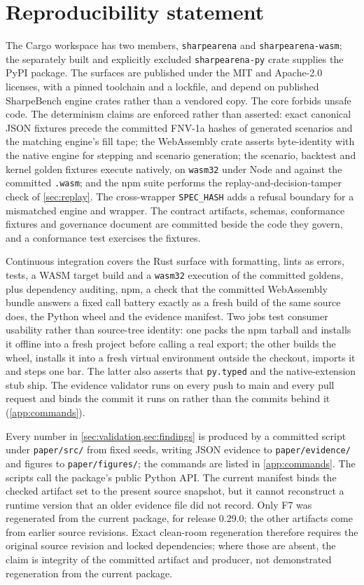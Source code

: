 \section{Reproducibility statement}\label{sec:repro}

The Cargo workspace has two members, \texttt{sharpearena} and \texttt{sharpearena-wasm}; the separately built and explicitly excluded \texttt{sharpearena-py} crate supplies the PyPI package. The surfaces are published under the MIT and Apache-2.0 licenses, with a pinned toolchain and a lockfile, and depend on published SharpeBench engine crates rather than a vendored copy. The core forbids unsafe code. The determinism claims are enforced rather than asserted: exact canonical JSON fixtures precede the committed FNV-1a hashes of generated scenarios and the matching engine's fill tape; the WebAssembly crate asserts byte-identity with the native engine for stepping and scenario generation; the scenario, backtest and kernel golden fixtures execute natively, on \texttt{wasm32} under Node and against the committed \texttt{.wasm}; and the npm suite performs the replay-and-decision-tamper check of \cref{sec:replay}. The cross-wrapper \texttt{SPEC\_HASH} adds a refusal boundary for a mismatched engine and wrapper. The contract artifacts, schemas, conformance fixtures and governance document are committed beside the code they govern, and a conformance test exercises the fixtures.

Continuous integration covers the Rust surface with formatting, lints as errors, tests, a WASM target build and a \texttt{wasm32} execution of the committed goldens, plus dependency auditing, npm, a check that the committed WebAssembly bundle answers a fixed call battery exactly as a fresh build of the same source does, the Python wheel and the evidence manifest. Two jobs test consumer usability rather than source-tree identity: one packs the npm tarball and installs it offline into a fresh project before calling a real export; the other builds the wheel, installs it into a fresh virtual environment outside the checkout, imports it and steps one bar. The latter also asserts that \texttt{py.typed} and the native-extension stub ship. The evidence validator runs on every push to main and every pull request and binds the commit it runs on rather than the commits behind it (\cref{app:commands}).

Every number in \cref{sec:validation,sec:findings} is produced by a committed script under \texttt{paper/src/} from fixed seeds, writing JSON evidence to \texttt{paper/evidence/} and figures to \texttt{paper/figures/}; the commands are listed in \cref{app:commands}. The scripts call the package's public Python API. The current manifest binds the checked artifact set to the present source snapshot, but it cannot reconstruct a runtime version that an older evidence file did not record. Only F7 was regenerated from the current package, for release 0.29.0; the other artifacts come from earlier source revisions. Exact clean-room regeneration therefore requires the original source revision and locked dependencies; where those are absent, the claim is integrity of the committed artifact and producer, not demonstrated regeneration from the current package.

